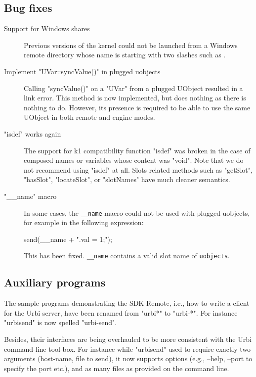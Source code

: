 \subsection{Bug fixes}
\begin{description}
\item[Support for Windows shares]

  Previous versions of the kernel could not be launched from a Windows
  remote directory whose name is starting with two slashes such as
  .

\item[Implement "UVar::syncValue()" in plugged uobjects]

Calling "syncValue()" on a "UVar" from a plugged UObject resulted in a
link error.  This method is now implemented, but does nothing as there
is nothing to do. However, its presence is required to be able to use
the same UObject in both remote and engine modes.

\item["isdef" works again]

The support for k1 compatibility function "isdef" was broken in the
case of composed names or variables whose content was "void". Note
that we do not recommend using "isdef" at all. Slots related methods
such as "getSlot", "hasSlot", "locateSlot", or "slotNames" have much
cleaner semantics.

\item["\_\_name" macro]

  In some cases, the \lstinline|__name| macro could not be used with
  plugged uobjects, for example in the following expression:

\begin{urbiunchecked}
send(__name + ".val = 1;");
\end{urbiunchecked}
  \noindent
  This has been fixed. \lstinline|__name| contains a valid slot name
  of \lstinline|uobjects|.
\end{description}

\subsection{Auxiliary programs}


The sample programs demonstrating the SDK Remote, i.e., how to write a
client for the Urbi server, have been renamed from "urbi*" to
"urbi-*".  For instance "urbisend" is now spelled "urbi-send".

Besides, their interfaces are being overhauled to be more consistent
with the Urbi command-line tool-box.  For instance while "urbisend"
used to require exactly two arguments (host-name, file to send), it
now supports options (e.g., --help, --port to specify the port etc.),
and as many files as provided on the command line.



